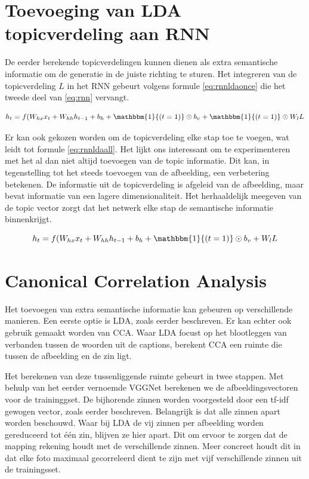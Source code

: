 \section{Toevoeging van LDA topicverdeling aan RNN}
De eerder berekende topicverdelingen kunnen dienen als extra semantische informatie om de generatie in de juiste richting te sturen. Het integreren van de topicverdeling $L$ in het RNN gebeurt volgens formule \eqref{eq:rnnldaonce} die het tweede deel van \eqref{eq:rnn} vervangt.

\begin{equation}
    h_t = f(W_{hx} x_{t} + W_{hh} h_{t-1} + b_h + \mathbbm{1}{(t=1)} \odot b_v +\mathbbm{1}{(t=1)} \odot W_lL
    \label{eq:rnnldaonce}
\end{equation}

Er kan ook gekozen worden om de topicverdeling elke stap toe te voegen, wat leidt tot formule \eqref{eq:rnnldaall}. Het lijkt ons interessant om te experimenteren met het al dan niet altijd toevoegen van de topic informatie. Dit kan, in tegenstelling tot het steeds toevoegen van de afbeelding, een verbetering betekenen. De informatie uit de topicverdeling is afgeleid van de afbeelding, maar bevat informatie van een lagere dimensionaliteit. Het herhaaldelijk meegeven van de topic vector zorgt dat het netwerk elke stap de semantische informatie binnenkrijgt.


\begin{equation}
    h_t = f(W_{hx} x_{t} + W_{hh} h_{t-1} + b_h + \mathbbm{1}{(t=1)} \odot b_v + W_lL
    \label{eq:rnnldaall}
\end{equation}



\section{Canonical Correlation Analysis}
Het toevoegen van extra semantische informatie kan gebeuren op verschillende manieren. Een eerste optie is LDA, zoals eerder beschreven. Er kan echter ook gebruik gemaakt worden van CCA. Waar LDA focust op het blootleggen van verbanden tussen de woorden uit de captions, berekent CCA een ruimte die tussen de afbeelding en de zin ligt.

Het berekenen van deze tussenliggende ruimte gebeurt in twee stappen. Met behulp van het eerder vernoemde VGGNet berekenen we de afbeeldingsvectoren voor de traininggset. De bijhorende zinnen worden voorgesteld door een tf-idf gewogen vector, zoals eerder beschreven. Belangrijk is dat alle zinnen apart worden beschouwd. Waar bij LDA de vij zinnen per afbeelding worden gereduceerd tot \'e\'en zin, blijven ze hier apart. Dit om ervoor te zorgen dat de mapping rekening houdt met de verschillende zinnen. Meer concreet houdt dit in dat elke foto maximaal gecorreleerd dient te zijn met vijf verschillende zinnen uit de trainingsset.

